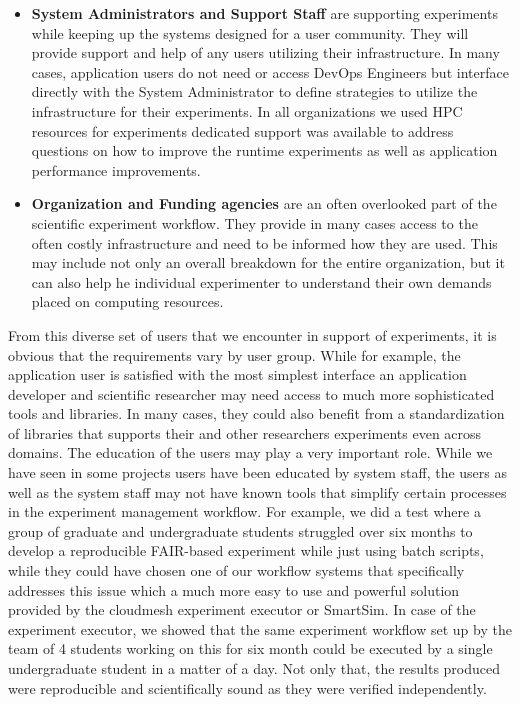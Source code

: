 \documentclass[utf8]{FrontiersinVancouver} %
\begin{document}
\begin{itemize}
    \item {\bf System Administrators and Support Staff} are supporting experiments while keeping up the systems designed for a user community. They will provide support and help of any users utilizing their infrastructure. In many cases, application users do not need or access DevOps Engineers but interface directly with the System Administrator to define strategies to utilize the infrastructure for their experiments. In all organizations we used HPC resources for experiments dedicated support was available to address questions on how to improve the runtime experiments as well as application performance improvements.
    \item {\bf Organization and Funding agencies} are an often overlooked part of the scientific experiment workflow. They provide in many cases access to the often costly infrastructure and need to be informed how they are used. This may include not only an overall breakdown for the entire organization, but it can also help he individual experimenter to understand their own demands placed on computing resources. 
\end{itemize}

From this diverse set of users that we encounter in support of experiments, it is obvious that the requirements vary by user group. While for example, the application user is satisfied with the most simplest interface an application developer and scientific researcher may need access to much more sophisticated tools and libraries. In many cases, they could also benefit from a standardization of libraries that supports their and other researchers experiments even across domains. The education of the users may play a very important role. While we have seen in some projects users have been educated by system staff, the users as well as the system staff may not have known tools that simplify certain processes in the experiment management workflow. For example, we did a test where a group of graduate and undergraduate students struggled over six months to develop a reproducible FAIR-based experiment while just using batch scripts, while they could have chosen one of our workflow systems that specifically addresses this issue which a much more easy to use and powerful solution provided by the cloudmesh experiment executor or SmartSim. In case of the experiment executor, we showed that the same experiment workflow set up by the team of 4 students working on this for six month could be executed by a single undergraduate student in a matter of a day. Not only that, the results produced were reproducible and scientifically sound as they were verified independently.
\end{document}
